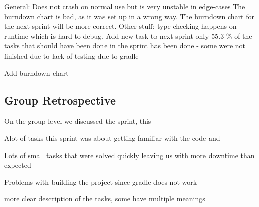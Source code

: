 General:
Does not crash on normal use but is very unstable in edge-cases
The burndown chart is bad, as it was set up in a wrong way. The burndown chart for the next sprint will be more correct.
Other stuff:
type checking happens on runtime which is hard to debug.
Add new task to next sprint
only 55.3 \% of the tasks that should have been done in the sprint has been
done - some were not finished due to lack of testing due to gradle

Add burndown chart


\subsection{Group Retrospective}

On the group level we discussed the sprint, this 

Alot of tasks this sprint was about getting familiar with the code and 


Lots of small tasks that were solved quickly leaving us with more downtime than
expected

Problems with building the project since gradle does not work

more clear description of the tasks, some have multiple meanings
